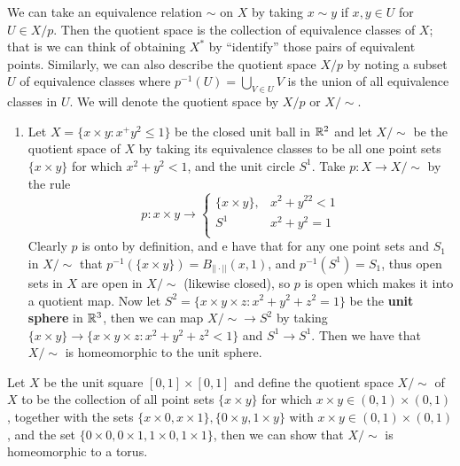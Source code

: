 We can take an equivalence relation $\sim$ on  $X$ by taking  $x \sim y$ if  $x,y \in U$ for  $U \in
X/p$. Then the quotient space is the collection of equivalence classes of $X$; that is we can think
of obtaining $X^*$ by ``identify'' those pairs of equivalent points. Similarly, we can also describe
the quotient space $X/p$ by noting a subset $U$ of equivalence classes where $p^{-1}(U)=\bigcup_{V
\in U}{V}$ is the union of all equivalence classes in $U$. We will denote the quotient space by
$X/p$ or  $X/\sim$.

\begin{example}
    \begin{enumerate}[label=(\arabic*)]
        \item     Let $X=\{x \times y: x^+y^2 \leq 1\}$ be the closed unit ball in $\mathbb{R}^2$ and let  $X/\sim$ be the
    quotient space of  $X$ by taking its equivalence classes to be all one point sets  $\{x \times
    y\}$ for which $x^2+y^2<1$, and the unit circle  $S^1$. Take  $p:X \rightarrow X/\sim$ by the
    rule
        \begin{equation*}
            p:x \times y \rightarrow \begin{cases}
                \{x \times y\}, & x^2+y^22<1 \\
                S^1        & x^2+y^2=1 \\ 
                      \end{cases}
        \end{equation*}
    Clearly $p$ is onto by definition, and e have that for any one point sets and  $ S_1$ in
    $X/\sim$ that  $p^{-1}(\{x \times y\})=B_{||\cdot||}(x,1)$, and $p^{-1}(S^1)=S_1$, thus open
    sets in $X$ are open in  $X/\sim$  (likewise closed), so $p$ is open which makes it into a
    quotient map. Now let  $S^2=\{x \times y \times z: x^2+y^2+z^2=1\}$ be the \textbf{unit sphere}
    in $\mathbb{R}^3$, then we can map  $X/\sim \rightarrow S^2$ by taking  $\{x \times y\} \rightarrow \{x
    \times y \times z: x^2+y^2+z^2<1\}$ and $ S^1 \rightarrow S^1$. Then we have that $X/\sim$ is
    homeomorphic to the unit sphere.		
    \end{enumerate}

        \item Let $X$ be the unit square  $[0,1] \times [0,1]$ and define the quotient space
            $X/\sim$ of $X$ to be the collection of all point sets $\{x \times y\}$ for which $x
            \times y \in (0,1) \times (0,1)$, together with the sets $\{x \times 0, x \times 1\},
            \{0 \times y, 1 \times y\}$ with $x \times y \in (0,1) \times (0,1)$, and the set $\{0
            \times 0, 0 \times 1, 1 \times 0, 1 \times 1\}$, then we can show that $X/\sim$ is
            homeomorphic to a torus.
\end{example} 

